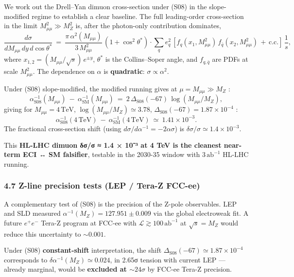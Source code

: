 \documentclass[
  11pt,
  a4paper,
]{article}
\begin{document}
We work out the Drell--Yan dimuon cross-section under (S08) in the slope-modified regime to establish a clear baseline. The full leading-order cross-section in the limit \(M_{\mu\mu}^2 \gg M_Z^2\) is, after the photon-only contribution dominates,
\[
\frac{d\sigma}{dM_{\mu\mu}\,dy\,d\cos\theta^*}\ =\ \frac{\pi\,\alpha^2(M_{\mu\mu})}{3\,M_{\mu\mu}^2}\,(1 + \cos^2\theta^*)\cdot\sum_q e_q^2\,\left[f_q(x_1, M_{\mu\mu}^2)\,f_{\bar q}(x_2, M_{\mu\mu}^2)\,+\,\text{c.c.}\right]\,\frac{1}{s},
\]
where \(x_{1,2} = (M_{\mu\mu}/\sqrt s)\,e^{\pm y}\), \(\theta^*\) is the Collins--Soper angle, and \(f_{q,\bar q}\) are PDFs at scale \(M_{\mu\mu}^2\). The dependence on \(\alpha\) is \textbf{quadratic}: \(\sigma \propto \alpha^2\).

Under (S08) slope-modified, the modified running gives at \(\mu = M_{\mu\mu} \gg M_Z\) :
\[
\alpha^{-1}_{\mathrm{S08}}(M_{\mu\mu})\ -\ \alpha^{-1}_{\mathrm{SM}}(M_{\mu\mu})\ =\ 2\,\Delta_{\mathrm{S08}}(-67)\,\log(M_{\mu\mu}/M_Z),
\]
giving for \(M_{\mu\mu} = 4\,\mathrm{TeV}\), \(\log(M_{\mu\mu}/M_Z) \simeq 3.78\), \(\Delta_{\mathrm{S08}}(-67) = 1.87\times 10^{-4}\) :
\[
\alpha^{-1}_{\mathrm{S08}}(4\,\mathrm{TeV})\ -\ \alpha^{-1}_{\mathrm{SM}}(4\,\mathrm{TeV})\ \simeq\ 1.41\times 10^{-3}.
\]
The fractional cross-section shift (using \(d\sigma/d\alpha^{-1} = -2\alpha\sigma\)) is \(\delta\sigma/\sigma \simeq 1.4 \times 10^{-3}\).

This \textbf{HL-LHC dimuon δσ/σ ≈ 1.4 × 10⁻³ at 4 TeV is the cleanest near-term ECI ↔ SM falsifier}, testable in the 2030-35 window with \(3\,\mathrm{ab}^{-1}\) HL-LHC running.

\hypertarget{z-line-precision-tests-lep-tera-z-fcc-ee}{%
\subsubsection{4.7 Z-line precision tests (LEP / Tera-Z FCC-ee)}\label{z-line-precision-tests-lep-tera-z-fcc-ee}}

A complementary test of (S08) is the precision of the Z-pole observables. LEP and SLD measured \(\alpha^{-1}(M_Z) = 127.951 \pm 0.009\) via the global electroweak fit. A future \(e^+e^-\) Tera-Z program at FCC-ee with \(\mathcal L \gtrsim 100\,\mathrm{ab}^{-1}\) at \(\sqrt s = M_Z\) would reduce this uncertainty to \(\sim 0.001\).

Under (S08) \textbf{constant-shift} interpretation, the shift \(\Delta_{\mathrm{S08}}(-67) \simeq 1.87 \times 10^{-4}\) corresponds to \(\delta\alpha^{-1}(M_Z) \simeq 0.024\), in 2.65σ tension with current LEP --- already marginal, would be \textbf{excluded at \(\sim 24\sigma\)} by FCC-ee Tera-Z precision.
\end{document}
